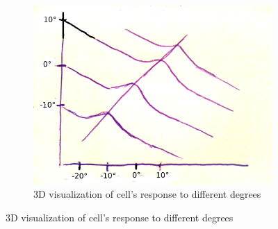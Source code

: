 \documentclass[english,11pt]{article}
\begin{document}
\begin{figure}[H]
        ~ 
        \begin{subfigure}[b]{0.3\textwidth}
                \centering
				\includegraphics[width=\textwidth]{3D-visualisation.png}
                \caption{3D visualization of cell's response to different degrees}
        \end{subfigure}
\end{figure}
\end{document}
